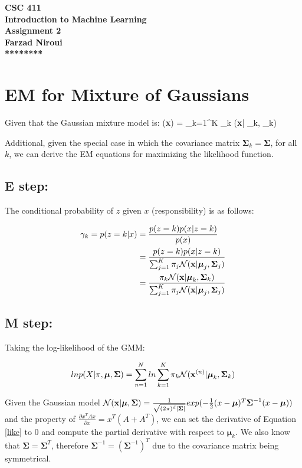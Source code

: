\documentclass[12pt]{article}
\def\beqa#1\eeqa{\begin{eqnarray}#1\end{eqnarray}}
\newcommand{\bmu}{{\boldsymbol{\mu}}}
\newcommand{\bSigma}{{\boldsymbol{\Sigma}}}
\newcommand{\bx}{{\bf{x}}}
\begin{document}
\begin{center}
{\bf CSC 411}\\
{\bf Introduction to Machine Learning}\\
{\large \bf Assignment 2}\\
{\bf Farzad Niroui}\\
{\bf *********}
\end{center}

\section{EM for Mixture of Gaussians}

Given that the Gaussian mixture model is:
\beqa
 p(\bx) = \sum_{k=1}^K \pi_k {}(\bx | \bmu_k, \bSigma_k)
\eeqa

Additional, given the special case in which the covariance matrix $\bSigma_k = \bSigma$, for all $k$, we can derive the EM equations for maximizing the likelihood function. 

\subsection*{E step:}
The conditional probability of $z$ given $x$ (responsibility) is as follows:

\begin{equation}\label{res}
\begin{split}
\gamma_k = p(z=k|x) & = \frac{p(z=k)p(x|z=k)}{p(x)} \\
&= \frac{p(z=k)p(x|z=k)}{\sum_{j=1}^K \pi_j {\cal{N}}(\bx | \bmu_j, \bSigma_j)} \\
&= \frac{\pi_k {\cal{N}}(\bx | \bmu_k, \bSigma_k)}{\sum_{j=1}^K \pi_j {\cal{N}}(\bx | \bmu_j, \bSigma_j)} \\
\end{split}
\end{equation}

\subsection*{M step:}
Taking the log-likelihood of the GMM:

\begin{equation}\label{like}
ln p(X|\pi,\bmu,\bSigma) = \sum_{n=1}^N ln \sum_{k=1}^K \pi_k {\cal{N}}(\bx^{(n)}| \bmu_k, \bSigma_k)
\end{equation}

Given the Gaussian model ${\cal{N}}(\bx | \bmu, \bSigma) = \frac{1}{\sqrt{(2\pi)^d|\bSigma|}}exp(-\frac{1}{2}(x-\bmu)^T\bSigma^{-1}(x-\bmu))$ and the property of $\frac{\partial x^TAx}{\partial x} = x^T(A+A^T)$, we can set the derivative of Equation \ref{like} to 0 and compute the partial derivative with respect to $\bmu_k$. We also know that $\bSigma = \bSigma^T$, therefore $\bSigma^{-1} = (\bSigma^{-1})^T$ due to the covariance matrix being symmetrical. 
\end{document}
